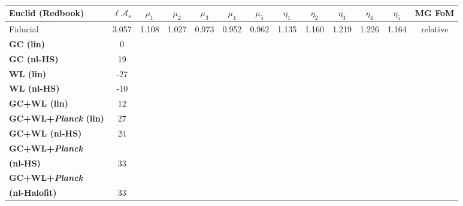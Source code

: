 \begin{table}[htbp]
\centering{}%
\tiny
\begin{tabular}{|l|c|c|c|c|c|c|c|c|c|c|c||c|}
\hline 
\Tstrut \textbf{Euclid} (Redbook)  & $\ell \mathcal{A}_{s}$  & $\mu_{1}$  & $\mu_{2}$  & $\mu_{3}$  & $\mu_{4}$  & $\mu_{5}$  & $\eta_{1}$  
& $\eta_{2}$  & $\eta_{3}$  & $\eta_{4}$ & $\eta_{5}$ & MG FoM
\tabularnewline
\hline 
\Tstrut Fiducial  & 3.057  & 1.108  & 1.027  & 0.973  & 0.952  & 0.962  & 1.135  & 1.160  & 1.219  & 1.226 & 1.164 &  relative\tabularnewline
\hline 
\Tstrut \textbf{GC (lin)}  \Tstrut   & 0 \tabularnewline
\Tstrut \textbf{GC (nl-HS)} \Tstrut  & 19  \tabularnewline
\hline
\hline
\Tstrut \textbf{WL (lin)}    
& -27\tabularnewline
\Tstrut \textbf{WL (nl-HS)}   
& -10  \tabularnewline
\hline
\hline
\Tstrut \textbf{GC+WL (lin)} 
& 12  \tabularnewline
\Tstrut \textbf{GC+WL+{\it Planck} (lin)} 
& 27 \tabularnewline
\hline
\hline
\Tstrut \textbf{GC+WL (nl-HS)} 
& 24 \tabularnewline
\Tstrut \textbf{GC+WL+{\it Planck}} &  &   &  &   &  &   &   &  &   &  & & 
\tabularnewline \textbf{(nl-HS)}  
 
& 33 \tabularnewline
\Tstrut \textbf{GC+WL+{\it Planck}} &  &   &  &   &  &   &   &  &   &  & & 
\tabularnewline \textbf{(nl-Halofit)}  
 
& 33 \tabularnewline
\hline
\end{tabular}
\small
\protect\caption[1$\sigma$ marginalized errors for a Euclid GC and WL survey in a redshift binned scenario of MG.]{\label{tab:errors-all-MGBin3}
}
\end{table}
